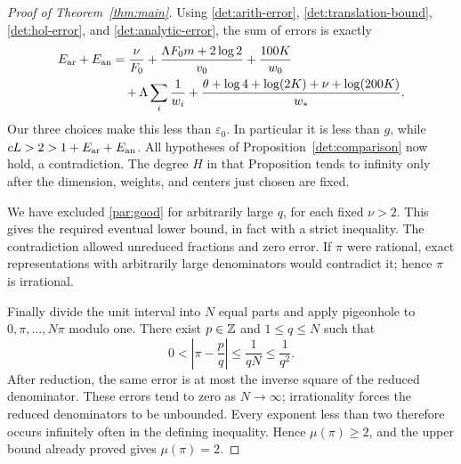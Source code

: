 \begin{proof}[Proof of Theorem~\ref{thm:main}]
Using \eqref{det:arith-error}, \eqref{det:translation-bound},
\eqref{det:hol-error}, and \eqref{det:analytic-error}, the sum of errors
is exactly
\[
\begin{aligned}
E_{\rm ar}+E_{\rm an}
&=\frac{\nu}{F_0}
 +\frac{\Lambda F_0m+2\log2}{v_0}+\frac{100K}{w_0}\\
&\quad +\Lambda\sum_i\frac1{w_i}
 +\frac{\theta+\log4+\log(2K)+\nu+\log(200K)}{w_*}.
\end{aligned}
\]
Our three choices make this less than \(\varepsilon_0\).
In particular it is less than \(g\), while
\(cL>2>1+E_{\rm ar}+E_{\rm an}\).
All hypotheses of Proposition~\ref{det:comparison} now hold,
a contradiction. The degree \(H\) in that Proposition tends to infinity
only after the dimension, weights, and centers just chosen are fixed.

We have excluded \eqref{par:good} for arbitrarily large \(q\), for
each fixed \(\nu>2\). This gives the required eventual lower bound,
in fact with a strict inequality. The contradiction allowed unreduced
fractions and zero error. If \(\pi\) were rational, exact representations
with arbitrarily large denominators would contradict it; hence
\(\pi\) is irrational.

Finally divide the unit interval into \(N\) equal parts and apply
pigeonhole to \(0,\pi,\ldots,N\pi\) modulo one. There exist \(p\in\mathbb Z\)
and \(1\le q\le N\) such that
\[
0<\left|\pi-\frac pq\right|\le\frac1{qN}\le\frac1{q^2}.
\]
After reduction, the same error is at most the inverse square of the
reduced denominator. These errors tend to zero as \(N\to\infty\);
irrationality forces the reduced denominators to be unbounded.
Every exponent less than two therefore occurs infinitely often in
the defining inequality. Hence \(\mu(\pi)\ge2\), and the upper bound
already proved gives \(\mu(\pi)=2\).
\end{proof}

